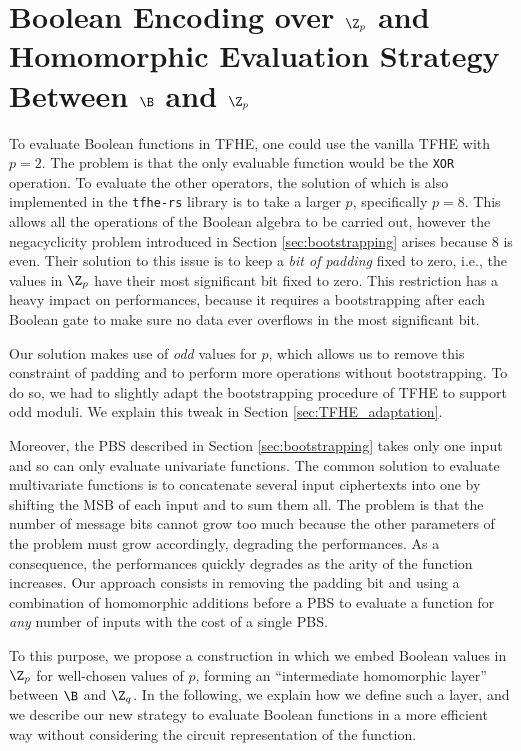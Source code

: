 \section{Boolean Encoding over $\Z_p$ and Homomorphic Evaluation Strategy Between $\B$ and $\Z_p$}
\label{sec:homorphic_layer}

To evaluate Boolean functions in TFHE, one could use the vanilla TFHE with $p=2$. The problem is that the only evaluable function would be the \texttt{XOR} operation. To evaluate the other operators, the solution of \cite{cryptoeprint:2018/421} which is also implemented in the \texttt{tfhe-rs} library \cite{tfhe-rs} is to take a larger $p$, specifically $p=8$. This allows all the operations of the Boolean algebra to be carried out, however the negacyclicity problem introduced in Section \ref{sec:bootstrapping} arises because $8$ is even. Their solution to this issue is to keep a \emph{bit of padding} fixed to zero, i.e., the values in $\Z_p$ have their most significant bit fixed to zero. This restriction has a heavy impact on performances, because it requires a bootstrapping after each Boolean gate to make sure no data ever overflows in the most significant bit.

Our solution makes use of \emph{odd} values for $p$, which allows us to remove this constraint of padding and to perform more operations without bootstrapping. To do so, we had to slightly adapt the bootstrapping procedure of TFHE to support odd moduli. We explain this tweak in Section  \ref{sec:TFHE_adaptation}.

Moreover, the PBS described in Section \ref{sec:bootstrapping} takes only one input and so can only evaluate univariate functions. The common solution to evaluate multivariate functions is to concatenate several input ciphertexts into one by shifting the MSB of each input and to sum them all. The problem is that the number of message bits cannot grow too much because the other parameters of the \LWE problem must grow accordingly, degrading the performances. As a consequence, the performances quickly degrades as the arity of the function increases. Our approach consists in removing the padding bit and using a combination of homomorphic additions before a PBS to evaluate a function for \emph{any} number of inputs with the cost of a single PBS.


To this purpose, we propose a construction in which we embed Boolean values in $\Z_p$ for well-chosen values of $p$, forming an ``intermediate homomorphic layer'' between $\B$ and $\Z_q$. In the following, we explain how we define such a layer, and we describe our new strategy to evaluate Boolean functions in a more efficient way without considering the circuit representation of the function.


